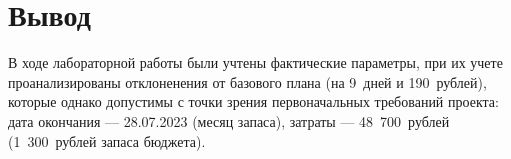 \section{Вывод}

В ходе лабораторной работы были учтены фактические параметры, при их учете
проанализированы отклоненения от базового плана (на 9~дней и 190~рублей),
которые однако допустимы с точки зрения первоначальных требований проекта: дата
окончания --- 28.07.2023 (месяц запаса), затраты --- 48~700~рублей (1~300~рублей
запаса бюджета).

